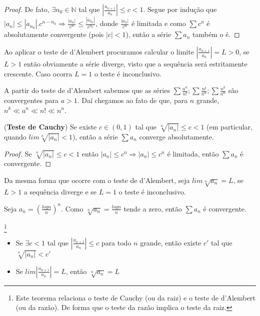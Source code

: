 \begin{proof}
De fato, $\exists n_{0} \in \mathbb{N}$ tal que $|\frac{a_{n+1}}{a_{n}}|\leq c <1$. Segue por indução que $|a_{n}|\leq |a_{n_{0}}|.c^{n-n_{0}}\Rightarrow \frac{|a_{n}|}{c^{n}}\leq \frac{|a_{n_{0}}|}{c^{n_{0}}}$, donde $\frac{|a_{n}|}{c^{n}}$ é limitada e como $\sum c^{n}$ é absolutamente convergente (pois $|c|<1$), então a série $\sum a_{n}$ também o é.
\end{proof}

Ao aplicar o teste de d'Alembert procuramos calcular o limite $|\frac{a_{n+1}}{a_{n}}|=L>0$, se $L>1$ então obviamente a série diverge, visto que a sequência será estritamente crescente. Caso ocorra $L=1$ o teste é inconclusivo.

\begin{exem}
A partir do teste de d'Alembert sabemos que as séries $\sum \frac{a^{n}}{n!};\sum \frac{n!}{n^{n}};\sum \frac{n^{k}}{a^{n}}$ são convergentes para $a>1$. Daí chegamos ao fato de que, para $n$ grande, $n^{k}\ll a^{n} \ll n! \ll  n^{n}$.
\end{exem}

\begin{theorem}(\textbf{Teste de Cauchy})
Se existe $c \in (0,1)$ tal que $\sqrt[n]{|a_{n}|}\leq c<1$ (em particular, quando $lim\sqrt[n]{|a_{n}|}<1$), então a série $\sum a_{n}$ converge absolutamente.
\end{theorem}

\begin{proof}
Se $\sqrt[n]{|a_{n}|}\leq c<1$ então $|a_{n}|\leq c^{n}\Rightarrow |a_{n}|\leq c^{n}$ é limitada, então $\sum a_{n}$ é convergente.
\end{proof}
Da mesma forma que ocorre com o teste de d'Alembert, seja $lim \sqrt[n]{a_{n}}=L$, se $L>1$ a sequência diverge e se $L=1$ o teste é inconclusivo.

\begin{exem}
Seja $a_{n}=(\frac{log n}{n})^{n}$. Como $\sqrt[n]{a_{n}}=\frac{log n}{n}$ tende a zero, então $\sum a_{n}$ é convergente.
\end{exem}

\begin{theorem}\footnote{Este teorema relaciona o teste de Cauchy (ou da raiz) e o teste de d'Alembert (ou da razão). De forma que o teste da razão implica o teste da raiz. }
\begin{itemize}
    \item Se $\exists c<1$ tal que $|\frac{a_{n+1}}{a_{n}}|\leq c$ para todo $n$ grande, então existe $c'$ tal que $\sqrt[n]{|a_{n}|}< c'$
    \item Se $lim |\frac{a_{n+1}}{a_{n}}|=L$, então $\sqrt[n]{a_{n}}=L$
\end{itemize}
\end{theorem}



